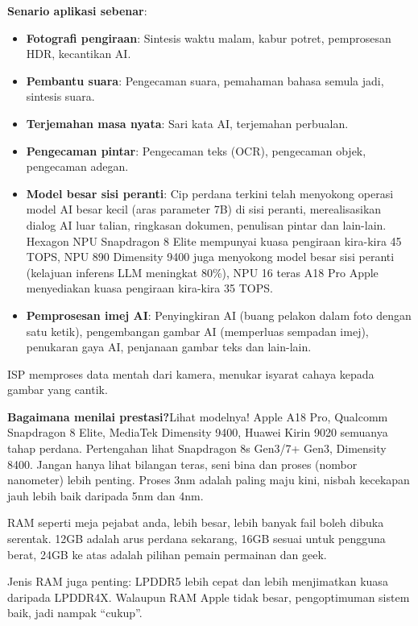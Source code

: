 \textbf{Senario aplikasi sebenar}:

\begin{itemize}
  \item \textbf{Fotografi pengiraan}: Sintesis waktu malam, kabur potret, pemprosesan HDR, kecantikan AI.
  \item \textbf{Pembantu suara}: Pengecaman suara, pemahaman bahasa semula jadi, sintesis suara.
  \item \textbf{Terjemahan masa nyata}: Sari kata AI, terjemahan perbualan.
  \item \textbf{Pengecaman pintar}: Pengecaman teks (OCR), pengecaman objek, pengecaman adegan.
  \item \textbf{Model besar sisi peranti}: Cip perdana terkini telah menyokong operasi model AI besar kecil (aras parameter 7B) di sisi peranti, merealisasikan dialog AI luar talian, ringkasan dokumen, penulisan pintar dan lain-lain. Hexagon NPU Snapdragon 8 Elite mempunyai kuasa pengiraan kira-kira 45 TOPS, NPU 890 Dimensity 9400 juga menyokong model besar sisi peranti (kelajuan inferens LLM meningkat 80\%), NPU 16 teras A18 Pro Apple menyediakan kuasa pengiraan kira-kira 35 TOPS.
  \item \textbf{Pemprosesan imej AI}: Penyingkiran AI (buang pelakon dalam foto dengan satu ketik), pengembangan gambar AI (memperluas sempadan imej), penukaran gaya AI, penjanaan gambar teks dan lain-lain.
\end{itemize}


ISP memproses data mentah dari kamera, menukar isyarat cahaya kepada gambar yang cantik.

\textbf{Bagaimana menilai prestasi?}Lihat modelnya! Apple A18 Pro, Qualcomm Snapdragon 8 Elite, MediaTek Dimensity 9400, Huawei Kirin 9020 semuanya tahap perdana. Pertengahan lihat Snapdragon 8s Gen3/7+ Gen3, Dimensity 8400. Jangan hanya lihat bilangan teras, seni bina dan proses (nombor nanometer) lebih penting. Proses 3nm adalah paling maju kini, nisbah kecekapan jauh lebih baik daripada 5nm dan 4nm.


RAM seperti meja pejabat anda, lebih besar, lebih banyak fail boleh dibuka serentak. 12GB adalah arus perdana sekarang, 16GB sesuai untuk pengguna berat, 24GB ke atas adalah pilihan pemain permainan dan geek.

Jenis RAM juga penting: LPDDR5 lebih cepat dan lebih menjimatkan kuasa daripada LPDDR4X. Walaupun RAM Apple tidak besar, pengoptimuman sistem baik, jadi nampak “cukup”.

